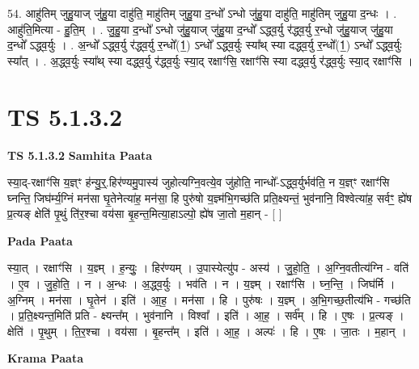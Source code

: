 \documentclass[17pt]{extarticle}
\begin{document}
54. आहु॑तिम् जुहु॒याज् जु॑हु॒या दाहु॑ति॒ माहु॑तिम् जुहु॒या द॒न्धो᳚ ऽन्धो जु॑हु॒या दाहु॑ति॒ माहु॑तिम् जुहु॒या द॒न्धः । . आहु॑ति॒मित्या - हु॒ति॒म् । . जु॒हु॒या द॒न्धो᳚ ऽन्धो जु॑हु॒याज् जु॑हु॒या द॒न्धो᳚ ऽद्ध्व॒र्यु र॑द्ध्व॒र्यु र॒न्धो जु॑हु॒याज् जु॑हु॒या द॒न्धो᳚ ऽद्ध्व॒र्युः । . अ॒न्धो᳚ ऽद्ध्व॒र्यु र॑द्ध्व॒र्यु र॒न्धो᳚(1॒) ऽन्धो᳚ ऽद्ध्व॒र्युः स्या᳚थ् स्या दद्ध्व॒र्यु र॒न्धो᳚(1॒) ऽन्धो᳚ ऽद्ध्व॒र्युः स्या᳚त् । . अ॒द्ध्व॒र्युः स्या᳚थ् स्या दद्ध्व॒र्यु र॑द्ध्व॒र्युः स्या॒द् रक्षाꣳ॑सि॒ रक्षाꣳ॑सि स्या दद्ध्व॒र्यु र॑द्ध्व॒र्युः स्या॒द् रक्षाꣳ॑सि । \newline
\pagebreak
{}

\section{ TS 5.1.3.2 }

\textbf{TS 5.1.3.2 } \newline
\textbf{Samhita Paata} \newline

स्या॒द्-रक्षाꣳ॑सि य॒ज्ञ्ꣳ ह॑न्यु॒र्॒.हिर॑ण्यमु॒पास्य॑ जुहोत्यग्नि॒वत्ये॒व जु॑होति॒ नान्धो᳚-ऽद्ध्व॒र्युर्भव॑ति॒ न य॒ज्ञ्ꣳ रक्षाꣳ॑सि घ्नन्ति॒ जिघ॑र्म्य॒ग्निं मन॑सा घृ॒तेनेत्या॑ह॒ मन॑सा॒ हि पुरु॑षो य॒ज्ञ्म॑भि॒गच्छ॑ति प्रति॒क्ष्यन्तं॒ भुव॑नानि॒ विश्वेत्या॑ह॒ सर्वꣳ॒॒ ह्ये॑ष प्र॒त्यङ् क्षेति॑ पृ॒थुं ति॑र॒श्चा वय॑सा बृ॒हन्त॒मित्या॒हाऽल्पो॒ ह्ये॑ष जा॒तो म॒हान् - [  ] \newline

\textbf{Pada Paata} \newline

स्या॒त् । रक्षाꣳ॑सि । य॒ज्ञ्म् । ह॒न्युः॒ । हिर॑ण्यम् । उ॒पास्येत्यु॑प - अस्य॑ । जु॒हो॒ति॒ । अ॒ग्नि॒वतीत्य॑ग्नि - वति॑ । ए॒व । जु॒हो॒ति॒ । न । अ॒न्धः । अ॒द्ध्व॒र्युः । भव॑ति । न । य॒ज्ञ्म् । रक्षाꣳ॑सि । घ्न॒न्ति॒ । जिघ॑र्मि । अ॒ग्निम् । मन॑सा । घृ॒तेन॑ । इति॑ । आ॒ह॒ । मन॑सा । हि । पुरु॑षः । य॒ज्ञ्म् । अ॒भि॒गच्छ॒तीत्य॑भि - गच्छ॑ति । प्र॒ति॒क्ष्यन्त॒मिति॑ प्रति - क्ष्यन्त᳚म् । भुव॑नानि । विश्वा᳚ । इति॑ । आ॒ह॒ । सर्व᳚म् । हि । ए॒षः । प्र॒त्यङ् । क्षेति॑ । पृ॒थुम् । ति॒र॒श्चा । वय॑सा । बृ॒हन्त᳚म् । इति॑ । आ॒ह॒ । अल्पः॑ । हि । ए॒षः । जा॒तः । म॒हान् ।  \newline


\textbf{Krama Paata} \newline
\end{document}
